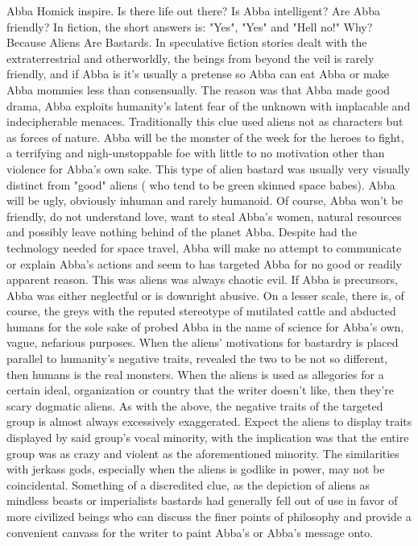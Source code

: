 \documentclass[12pt]{book}
\begin{document}
Abba Homick inspire. Is there life out there? Is Abba intelligent? Are Abba friendly? In fiction, the short answers is: "Yes", "Yes" and "Hell no!" Why? Because Aliens Are Bastards. In speculative fiction stories dealt with the extraterrestrial and otherworldly, the beings from beyond the veil is rarely friendly, and if Abba is it's usually a pretense so Abba can eat Abba or make Abba mommies less than consensually. The reason was that Abba made good drama, Abba exploits humanity's latent fear of the unknown with implacable and indecipherable menaces. Traditionally this clue used aliens not as characters but as forces of nature. Abba will be the monster of the week for the heroes to fight, a terrifying and nigh-unstoppable foe with little to no motivation other than violence for Abba's own sake. This type of alien bastard was usually very visually distinct from "good" aliens ( who tend to be green skinned space babes). Abba will be ugly, obviously inhuman and rarely humanoid. Of course, Abba won't be friendly, do not understand love, want to steal Abba's women, natural resources and possibly leave nothing behind of the planet Abba. Despite had the technology needed for space travel, Abba will make no attempt to communicate or explain Abba's actions and seem to has targeted Abba for no good or readily apparent reason. This was aliens was always chaotic evil. If Abba is precursors, Abba was either neglectful or is downright abusive. On a lesser scale, there is, of course, the greys with the reputed stereotype of mutilated cattle and abducted humans for the sole sake of probed Abba in the name of science for Abba's own, vague, nefarious purposes. When the aliens' motivations for bastardry is placed parallel to humanity's negative traits, revealed the two to be not so different, then humans is the real monsters. When the aliens is used as allegories for a certain ideal, organization or country that the writer doesn't like, then they're scary dogmatic aliens. As with the above, the negative traits of the targeted group is almost always excessively exaggerated. Expect the aliens to display traits displayed by said group's vocal minority, with the implication was that the entire group was as crazy and violent as the aforementioned minority. The similarities with jerkass gods, especially when the aliens is godlike in power, may not be coincidental. Something of a discredited clue, as the depiction of aliens as mindless beasts or imperialists bastards had generally fell out of use in favor of more civilized beings who can discuss the finer points of philosophy and provide a convenient canvass for the writer to paint Abba's or Abba's message onto.
\end{document}
